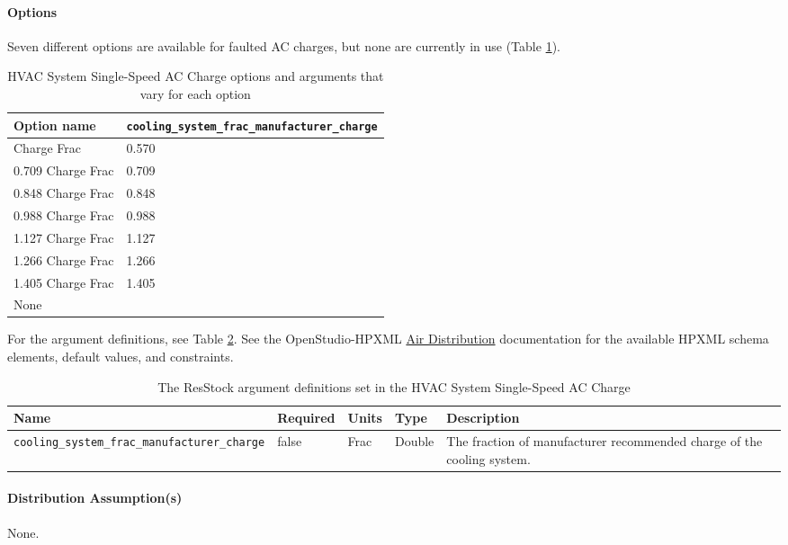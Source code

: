 \paragraph{Options}
Seven different options are available for faulted AC charges, but none are currently in use (Table \ref{table:hc_opt_ss_ac_charge}). 

\begin{longtable}[]{|p{3.5cm}|p{6cm}|}\caption{HVAC System Single-Speed AC Charge options and arguments that vary for each option} \label{table:hc_opt_ss_ac_charge} \\
\toprule\noalign{}
Option name &
\texttt{cooling\_system\_frac\_manufacturer\_charge} \\
\midrule\noalign{}
\endhead
\bottomrule\noalign{}
\endlastfoot
0.570 Charge Frac & 0.570 \\
0.709 Charge Frac & 0.709 \\
0.848 Charge Frac & 0.848 \\
0.988 Charge Frac & 0.988 \\
1.127 Charge Frac & 1.127 \\
1.266 Charge Frac & 1.266 \\
1.405 Charge Frac & 1.405 \\
None & \\
\end{longtable}

For the argument definitions, see Table \ref{table:hc_arg_def_hvac_ss_ac_charge}. See the OpenStudio-HPXML \href{https://openstudio-hpxml.readthedocs.io/en/v1.8.1/workflow_inputs.html#hpxml-air-distribution}{Air Distribution} documentation for the available HPXML schema elements, default values, and constraints.

\begin{longtable}[]{|p{3.5cm}|p{1.5cm}|p{1.3cm}|p{1.1cm}|p{3.3cm}|} \caption{The ResStock argument definitions set in the HVAC System Single-Speed AC Charge} \label{table:hc_arg_def_hvac_ss_ac_charge}\\
\toprule\noalign{}
Name & Required & Units & Type & Description \\
\midrule\noalign{}
\endhead
\bottomrule\noalign{}
\endlastfoot
\texttt{cooling\_system\_frac\_manufacturer\_charge} & false & Frac &
Double & The fraction of manufacturer recommended charge of the
cooling system. \\
\end{longtable}
\paragraph{Distribution Assumption(s)}
None.


